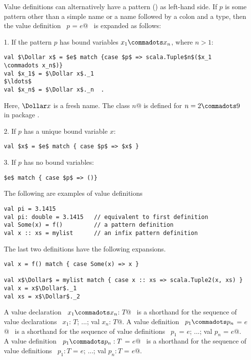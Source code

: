 Value definitions can alternatively have a pattern
() as left-hand side.  If $p$ is some pattern other
than a simple name or a name followed by a colon and a type, then the
value definition ~\lstinline@val $p$ = $e$@~ is expanded as follows:

1. If the pattern $p$ has bound variables $x_1 \commadots x_n$, where $n > 1$:
\begin{lstlisting}
val $\Dollar x$ = $e$ match {case $p$ => scala.Tuple$n$($x_1 \commadots x_n$)}
val $x_1$ = $\Dollar x$._1
$\ldots$
val $x_n$ = $\Dollar x$._n  .
\end{lstlisting}
Here, $\Dollar x$ is a fresh name.  The class
\lstinline@Tuple$n$@ is defined for $n = 2 \commadots 9$ in package
.

2. If $p$ has a unique bound variable $x$:
\begin{lstlisting}
val $x$ = $e$ match { case $p$ => $x$ }
\end{lstlisting}

3. If $p$ has no bound variables:
\begin{lstlisting}
$e$ match { case $p$ => ()}
\end{lstlisting}

\example
The following are examples of value definitions
\begin{lstlisting}
val pi = 3.1415 
val pi: double = 3.1415   // equivalent to first definition
val Some(x) = f()         // a pattern definition
val x :: xs = mylist      // an infix pattern definition
\end{lstlisting}

The last two definitions have the following expansions.
\begin{lstlisting}
val x = f() match { case Some(x) => x }

val x$\Dollar$ = mylist match { case x :: xs => scala.Tuple2(x, xs) }
val x = x$\Dollar$._1 
val xs = x$\Dollar$._2 
\end{lstlisting}

A value declaration ~\lstinline@val $x_1 \commadots x_n$: $T$@~
is a
shorthand for the sequence of value declarations
~\lstinline@val $x_1$: $T$; ...; val $x_n$: $T$@.
A value definition ~\lstinline@val $p_1 \commadots p_n$ = $e$@~
is a
shorthand for the sequence of value definitions
~\lstinline@val $p_1$ = $e$; ...; val $p_n$ = $e$@.
A value definition ~\lstinline@val $p_1 \commadots p_n: T$ = $e$@~
is a
shorthand for the sequence of value definitions
~\lstinline@val $p_1: T$ = $e$; ...; val $p_n: T$ = $e$@.

